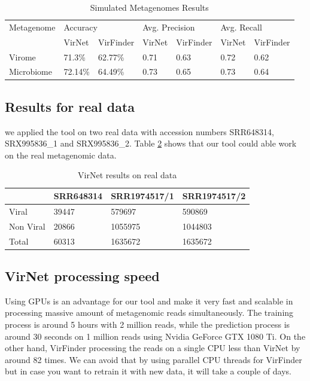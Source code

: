 \begin{table}[!htbp]
	\centering
	\begin{tabular}{||l l l l l l l||} 
		Metagenome &	\multicolumn{2}{l}{Accuracy} & \multicolumn{2}{l}{Avg. Precision} & \multicolumn{2}{l}{Avg. Recall}\\ [0.5ex] 
		& VirNet & VirFinder & VirNet & VirFinder & VirNet & VirFinder \\
		\hline\hline
		Virome & 71.3\% &	62.77\%	& 0.71 & 0.63 & 0.72 & 0.62 \\
		Microbiome &	72.14\% & 64.49\% &	0.73 & 0.65 & 0.73 & 0.64 \\ [1ex]
	\end{tabular}
	\caption{Simulated Metagenomes Results}
	\label{table:virfinder_results_simulated}
\end{table}

\subsection{Results for real data}
we applied the tool on two real data with accession numbers SRR648314, SRX995836\_1 and SRX995836\_2. Table \ref{table:virnet_results_real} shows that our tool could able work on the real metagenomic data. 

\begin{table}[]
	\centering
	\begin{tabular}{||llll||}
		& SRR648314 & SRR1974517/1 & SRR1974517/2 \\
		\hline\hline
		Viral     & 39447     & 579697       & 590869       \\
		Non Viral & 20866     & 1055975      & 1044803      \\
		Total     & 60313     & 1635672      & 1635672     
	\end{tabular}
	\caption{VirNet results on real data}
	\label{table:virnet_results_real}
\end{table}

\subsection{VirNet processing speed}
Using GPUs is an advantage for our tool and make it very fast and scalable in processing massive amount of metagenomic reads simultaneously. The training process is around 5 hours with 2 million reads, while the prediction process is around 30 seconds on 1 million reads using Nvidia GeForce GTX 1080 Ti. On the other hand, VirFinder processing the reads on a single CPU less than VirNet by around 82 times. We can avoid that by using parallel CPU threads for VirFinder but in case you want to retrain it with new data, it will take a couple of days.

